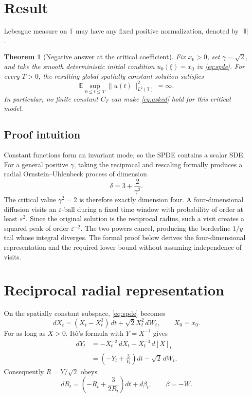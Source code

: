\documentclass[10pt]{article}
\newtheorem{theorem}{Theorem}
\newcommand{\E}{\mathbb E}
\newcommand{\Torus}{\mathbb T}
\newcommand{\1}{\mathbf 1}
\begin{document}
\section{Result}

Lebesgue measure on $\Torus$ may have any fixed positive normalization,
denoted by $|\Torus|$.

\begin{theorem}[Negative answer at the critical coefficient]\label{thm:main}
Fix $x_0>0$, set $\gamma=\sqrt2$, and take the smooth deterministic initial
condition $u_0(\xi)=x_0$ in \eqref{eq:spde}.  For every $T>0$, the resulting
global spatially constant solution satisfies
\[
  \E\sup_{0\le t\le T}\|u(t)\|_{L^2(\Torus)}^2=\infty.
\]
In particular, no finite constant $C_T$ can make \eqref{eq:asked} hold for
this critical model.
\end{theorem}

\subsection*{Proof intuition}

Constant functions form an invariant mode, so the SPDE contains a scalar SDE.
For a general positive $\gamma$, taking the reciprocal and rescaling formally
produces a radial Ornstein--Uhlenbeck process of dimension
\[
  \delta=3+\frac{2}{\gamma^2}.
\]
The critical value $\gamma^2=2$ is therefore exactly dimension four.  A
four-dimensional diffusion visits an $\varepsilon$-ball during a fixed time
window with probability of order at least $\varepsilon^2$.  Since the original
solution is the reciprocal radius, such a visit creates a squared peak of
order $\varepsilon^{-2}$.  The two powers cancel, producing the borderline
$1/y$ tail whose integral diverges.  The formal proof below derives the
four-dimensional representation and the required lower bound without assuming
independence of visits.

\section{Reciprocal radial representation}

On the spatially constant subspace, \eqref{eq:spde} becomes
\begin{equation}\label{eq:scalar}
 dX_t=(X_t-X_t^3)\,dt+\sqrt2 X_t^2\,dW_t,
 \qquad X_0=x_0.
\end{equation}
For as long as $X>0$, It\^o's formula with $Y=X^{-1}$ gives
\begin{align*}
 dY_t
 &= -X_t^{-2}\,dX_t+X_t^{-3}\,d[X]_t \\
 &=\left(-Y_t+\frac{3}{Y_t}\right)dt-\sqrt2\,dW_t.
\end{align*}
Consequently $R=Y/\sqrt2$ obeys
\begin{equation}\label{eq:radial}
 dR_t=\left(-R_t+\frac{3}{2R_t}\right)dt+d\beta_t,
 \qquad \beta=-W.
\end{equation}
\end{document}
